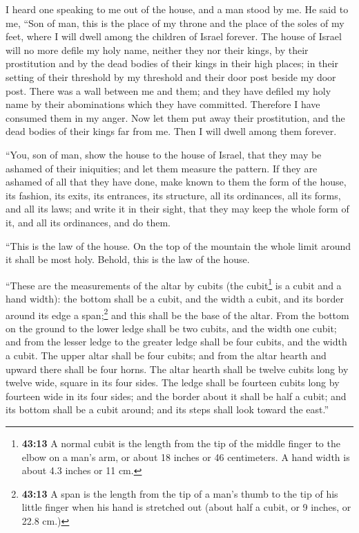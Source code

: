  I heard one speaking to me out of the house, and a man
stood by me.  He said to me, ``Son of man, this is the
place of my throne and the place of the soles of my feet, where I will
dwell among the children of Israel forever. The house of Israel will no
more defile my holy name, neither they nor their kings, by their
prostitution and by the dead bodies of their kings in their high places;
 in their setting of their threshold by my threshold and
their door post beside my door post. There was a wall between me and
them; and they have defiled my holy name by their abominations which
they have committed. Therefore I have consumed them in my anger.
 Now let them put away their prostitution, and the dead
bodies of their kings far from me. Then I will dwell among them forever.

 ``You, son of man, show the house to the house of
Israel, that they may be ashamed of their iniquities; and let them
measure the pattern.  If they are ashamed of all that
they have done, make known to them the form of the house, its fashion,
its exits, its entrances, its structure, all its ordinances, all its
forms, and all its laws; and write it in their sight, that they may keep
the whole form of it, and all its ordinances, and do them.

 ``This is the law of the house. On the top of the
mountain the whole limit around it shall be most holy. Behold, this is
the law of the house.

 ``These are the measurements of the altar by cubits (the
cubit\footnote{\textbf{43:13} A normal cubit is the length from the tip
  of the middle finger to the elbow on a man's arm, or about 18 inches
  or 46 centimeters. A hand width is about 4.3 inches or 11 cm.} is a
cubit and a hand width): the bottom shall be a cubit, and the width a
cubit, and its border around its edge a span;\footnote{\textbf{43:13} A
  span is the length from the tip of a man's thumb to the tip of his
  little finger when his hand is stretched out (about half a cubit, or 9
  inches, or 22.8 cm.)} and this shall be the base of the altar.
 From the bottom on the ground to the lower ledge shall
be two cubits, and the width one cubit; and from the lesser ledge to the
greater ledge shall be four cubits, and the width a cubit.
 The upper altar shall be four cubits; and from the altar
hearth and upward there shall be four horns.  The altar
hearth shall be twelve cubits long by twelve wide, square in its four
sides.  The ledge shall be fourteen cubits long by
fourteen wide in its four sides; and the border about it shall be half a
cubit; and its bottom shall be a cubit around; and its steps shall look
toward the east.''

